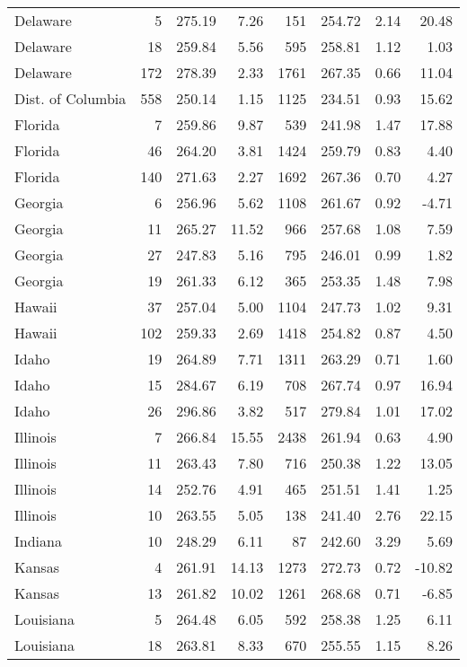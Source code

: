 \begin{longtable}{lrrr@{\extracolsep{10pt}}rrrr}
  Delaware &   5 & 275.19 & 7.26 & 151 & 254.72 & 2.14 & 20.48 \\ 
  Delaware &  18 & 259.84 & 5.56 & 595 & 258.81 & 1.12 & 1.03 \\ 
  Delaware & 172 & 278.39 & 2.33 & 1761 & 267.35 & 0.66 & 11.04 \\ 
  Dist. of Columbia & 558 & 250.14 & 1.15 & 1125 & 234.51 & 0.93 & 15.62 \\ 
  Florida &   7 & 259.86 & 9.87 & 539 & 241.98 & 1.47 & 17.88 \\ 
  Florida &  46 & 264.20 & 3.81 & 1424 & 259.79 & 0.83 & 4.40 \\ 
  Florida & 140 & 271.63 & 2.27 & 1692 & 267.36 & 0.70 & 4.27 \\ 
  Georgia &   6 & 256.96 & 5.62 & 1108 & 261.67 & 0.92 & -4.71 \\ 
  Georgia &  11 & 265.27 & 11.52 & 966 & 257.68 & 1.08 & 7.59 \\ 
  Georgia &  27 & 247.83 & 5.16 & 795 & 246.01 & 0.99 & 1.82 \\ 
  Georgia &  19 & 261.33 & 6.12 & 365 & 253.35 & 1.48 & 7.98 \\ 
  Hawaii &  37 & 257.04 & 5.00 & 1104 & 247.73 & 1.02 & 9.31 \\ 
  Hawaii & 102 & 259.33 & 2.69 & 1418 & 254.82 & 0.87 & 4.50 \\ 
  Idaho &  19 & 264.89 & 7.71 & 1311 & 263.29 & 0.71 & 1.60 \\ 
  Idaho &  15 & 284.67 & 6.19 & 708 & 267.74 & 0.97 & 16.94 \\ 
  Idaho &  26 & 296.86 & 3.82 & 517 & 279.84 & 1.01 & 17.02 \\ 
  Illinois &   7 & 266.84 & 15.55 & 2438 & 261.94 & 0.63 & 4.90 \\ 
  Illinois &  11 & 263.43 & 7.80 & 716 & 250.38 & 1.22 & 13.05 \\ 
  Illinois &  14 & 252.76 & 4.91 & 465 & 251.51 & 1.41 & 1.25 \\ 
  Illinois &  10 & 263.55 & 5.05 & 138 & 241.40 & 2.76 & 22.15 \\ 
  Indiana &  10 & 248.29 & 6.11 &  87 & 242.60 & 3.29 & 5.69 \\ 
  Kansas &   4 & 261.91 & 14.13 & 1273 & 272.73 & 0.72 & -10.82 \\ 
  Kansas &  13 & 261.82 & 10.02 & 1261 & 268.68 & 0.71 & -6.85 \\ 
  Louisiana &   5 & 264.48 & 6.05 & 592 & 258.38 & 1.25 & 6.11 \\ 
  Louisiana &  18 & 263.81 & 8.33 & 670 & 255.55 & 1.15 & 8.26 \\ 

\end{longtable}
